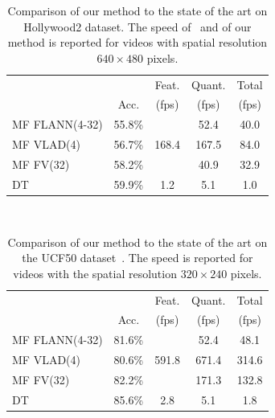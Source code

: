 \documentclass[10pt,twocolumn,letterpaper]{article}
\begin{document}
\begin{table}
\begin{center}
\begin{tabular}{|l|c|c|c|c|}
\hline
		 				&  	 		& Feat.                   	& Quant. 		& Total		\\
		 				& Acc.  	& (fps)								& (fps)			& (fps)		\\\hline
MF FLANN(4-32)	& 55.8\%	& \multirow{3}{*}{168.4} 	& 52.4    	& 40.0 	\\ %
MF VLAD(4) 		& 56.7\%	&										& 167.5	& 84.0	\\ %
MF FV(32)			& 58.2\%	&										& 40.9 	& 32.9	\\ %
\hline
DT \cite{Wang12}& 59.9\%		& 1.2									& 5.1 		&	1.0	\\\hline %
\end{tabular}
\mbox{}\\
\caption{Comparison of our method to the state of the art on Hollywood2 dataset. The speed of~\cite{Wang12} and of our method is reported for videos with spatial resolution $640\times 480$ pixels.\vspace{-.3cm}}
\label{tab:hwd2_comparison}
\end{center}
\end{table}



\begin{table}
\begin{center}
\begin{tabular}{|l|c|c|c|c|}
\hline
		 				&  	 	& Feat.                    & Quant. 	& Total	\\
		 				& Acc.  & (fps)                    & (fps) 	& (fps)	\\\hline
MF FLANN(4-32)	& 81.6\% & \multirow{3}{*}{591.8}   & 52.4  	& 48.1	\\ %
MF VLAD(4) 	 	& 80.6\% &                          & 671.4 	& 314.6	\\ %
MF FV(32)	 		& 82.2\% &                          & 171.3 	& 132.8	\\ %
\hline
DT \cite{Wang12}& 85.6\% & 2.8            	        & 5.1  	& 1.8\\\hline%
\end{tabular}
\smallskip
\caption{Comparison of our method to the state of the art on the UCF50 dataset~\cite{Reddy12}. The speed is reported for videos with the spatial resolution $320\times 240$ pixels.}
\label{tab:ucf_comparison}
\mbox{}\vspace{-1cm}\\
\end{center}
\end{table}
\end{document}
